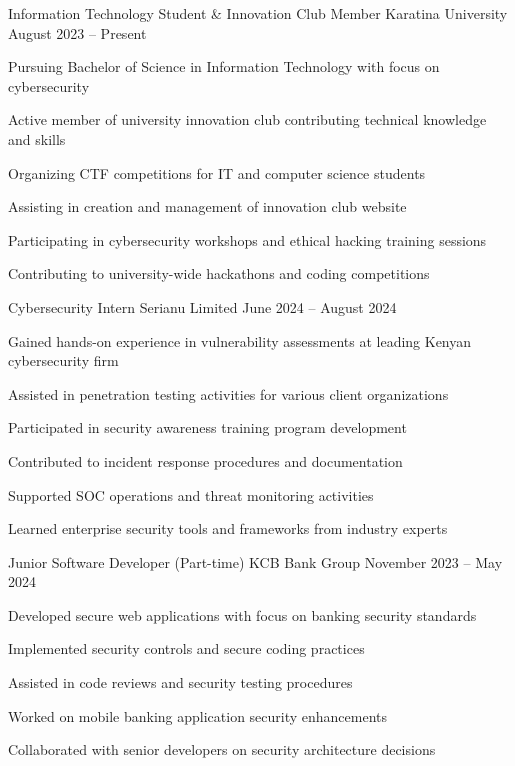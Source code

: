 \documentclass[]{resume-format}
\begin{document}
\begin{cventries}
    \cventry
    { Information Technology Student \& Innovation Club Member }
    { Karatina University }
    {}
    { August 2023 – Present }
    {\begin{cvitems}
        \item { Pursuing Bachelor of Science in Information Technology with focus on cybersecurity }
        \item { Active member of university innovation club contributing technical knowledge and skills }
        \item { Organizing CTF competitions for IT and computer science students }
        \item { Assisting in creation and management of innovation club website }
        \item { Participating in cybersecurity workshops and ethical hacking training sessions }
        \item { Contributing to university-wide hackathons and coding competitions }
    \end{cvitems}}
    \cventry
    { Cybersecurity Intern }
    { Serianu Limited }
    {}
    { June 2024 – August 2024 }
    {\begin{cvitems}
        \item { Gained hands-on experience in vulnerability assessments at leading Kenyan cybersecurity firm }
        \item { Assisted in penetration testing activities for various client organizations }
        \item { Participated in security awareness training program development }
        \item { Contributed to incident response procedures and documentation }
        \item { Supported SOC operations and threat monitoring activities }
        \item { Learned enterprise security tools and frameworks from industry experts }
    \end{cvitems}}
    \cventry
    { Junior Software Developer (Part-time) }
    { KCB Bank Group }
    {}
    { November 2023 – May 2024 }
    {\begin{cvitems}
        \item { Developed secure web applications with focus on banking security standards }
        \item { Implemented security controls and secure coding practices }
        \item { Assisted in code reviews and security testing procedures }
        \item { Worked on mobile banking application security enhancements }
        \item { Collaborated with senior developers on security architecture decisions }
    \end{cvitems}}
\end{cventries}
\end{document}
